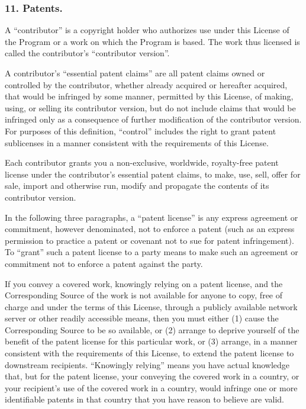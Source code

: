 \subsubsection{11. Patents.}
A “contributor” is a copyright holder who authorizes use under this License of the Program or a work on which the Program is based. The work thus licensed is called the contributor's “contributor version”.\par
A contributor's “essential patent claims” are all patent claims owned or controlled by the contributor, whether already acquired or hereafter acquired, that would be infringed by some manner, permitted by this License, of making, using, or selling its contributor version, but do not include claims that would be infringed only as a consequence of further modification of the contributor version. For purposes of this definition, “control” includes the right to grant patent sublicenses in a manner consistent with the requirements of this License.\par
Each contributor grants you a non-exclusive, worldwide, royalty-free patent license under the contributor's essential patent claims, to make, use, sell, offer for sale, import and otherwise run, modify and propagate the contents of its contributor version.\par
In the following three paragraphs, a “patent license” is any express agreement or commitment, however denominated, not to enforce a patent (such as an express permission to practice a patent or covenant not to sue for patent infringement). To “grant” such a patent license to a party means to make such an agreement or commitment not to enforce a patent against the party.\par
If you convey a covered work, knowingly relying on a patent license, and the Corresponding Source of the work is not available for anyone to copy, free of charge and under the terms of this License, through a publicly available network server or other readily accessible means, then you must either (1) cause the Corresponding Source to be so available, or (2) arrange to deprive yourself of the benefit of the patent license for this particular work, or (3) arrange, in a manner consistent with the requirements of this License, to extend the patent license to downstream recipients. “Knowingly relying” means you have actual knowledge that, but for the patent license, your conveying the covered work in a country, or your recipient's use of the covered work in a country, would infringe one or more identifiable patents in that country that you have reason to believe are valid.\par
